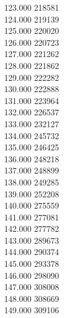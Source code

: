 { 123.000	218581 \\
 124.000	219139 \\
 125.000	220020 \\
 126.000	220723 \\
 127.000	221262 \\
 128.000	221862 \\
 129.000	222282 \\
 130.000	222888 \\
 131.000	223964 \\
 132.000	226537 \\
 133.000	232127 \\
 134.000	245732 \\
 135.000	246425 \\
 136.000	248218 \\
 137.000	248899 \\
 138.000	249285 \\
 139.000	252208 \\
 140.000	275559 \\
 141.000	277081 \\
 142.000	277782 \\
 143.000	289673 \\
 144.000	290374 \\
 145.000	293378 \\
 146.000	298090 \\
 147.000	308008 \\
 148.000	308669 \\
 149.000	309106 \\
}

